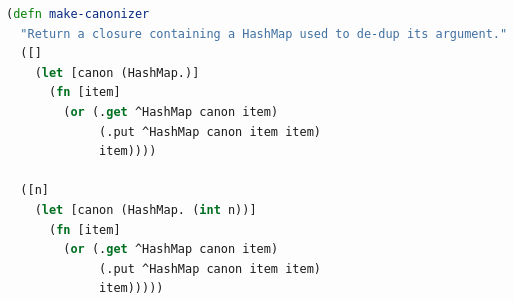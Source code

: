 \documentclass[11pt,openany,american,usenames,dvipsnames,svgnames,x11names,table,isodate]{article}
\numberwithin{equation}{section}
\numberwithin{figure}{section}
\begin{document}
\begin{minipage}[t]{1\columnwidth}%
\begin{lstlisting}[caption={Canonizer factory },label={lis:canonizer-factory},language=clojure,tabsize=2]
(defn make-canonizer
  "Return a closure containing a HashMap used to de-dup its argument."
  ([]       
    (let [canon (HashMap.)]
      (fn [item]
        (or (.get ^HashMap canon item)
             (.put ^HashMap canon item item)
             item))))

  ([n]
    (let [canon (HashMap. (int n))]
      (fn [item]
        (or (.get ^HashMap canon item)
             (.put ^HashMap canon item item)
             item)))))
\end{lstlisting}
%
\end{minipage}

\newpage{}



\end{document}
